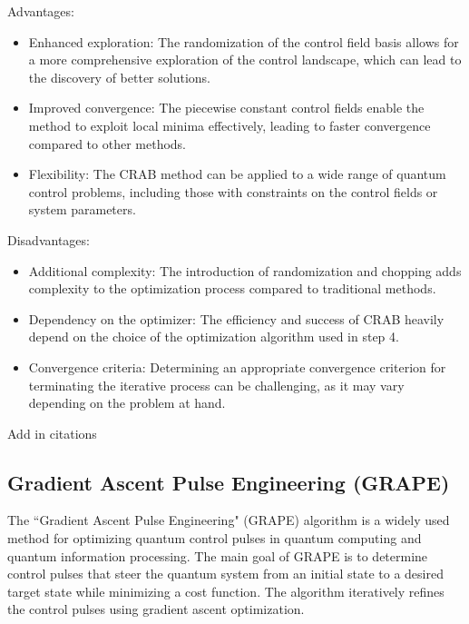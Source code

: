 Advantages:

\begin{itemize}
    \item Enhanced exploration: The randomization of the control field basis allows for a more comprehensive exploration of the control landscape, which can lead to the discovery of better solutions.
    \item Improved convergence: The piecewise constant control fields enable the method to exploit local minima effectively, leading to faster convergence compared to other methods.
    \item Flexibility: The CRAB method can be applied to a wide range of quantum control problems, including those with constraints on the control fields or system parameters.
\end{itemize}

Disadvantages:

\begin{itemize}
    \item Additional complexity: The introduction of randomization and chopping adds complexity to the optimization process compared to traditional methods.
    \item Dependency on the optimizer: The efficiency and success of CRAB heavily depend on the choice of the optimization algorithm used in step 4.
    \item Convergence criteria: Determining an appropriate convergence criterion for terminating the iterative process can be challenging, as it may vary depending on the problem at hand.
\end{itemize}

Add in citations \cite{caneva_chopped_2011, muller_one_2022}

\subsection{Gradient Ascent Pulse Engineering (GRAPE)}\label{sec:3.3.2_GRAPE}

The ``Gradient Ascent Pulse Engineering" (GRAPE) algorithm is a widely used method for optimizing quantum control pulses in quantum computing and quantum information processing. The main goal of GRAPE is to determine control pulses that steer the quantum system from an initial state to a desired target state while minimizing a cost function. The algorithm iteratively refines the control pulses using gradient ascent optimization.



